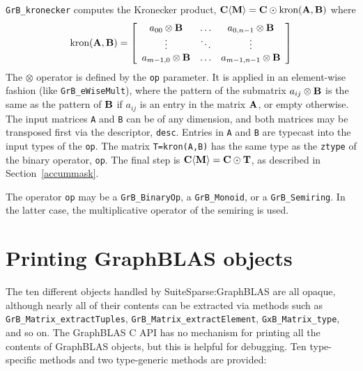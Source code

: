 \documentclass[12pt]{article}
\begin{document}
\verb'GrB_kronecker' computes the Kronecker product,
${\bf C \langle M \rangle = C \odot \mbox{kron}(A,B)}$ where
\[
\mbox{kron}{\bf (A,B)} =
\left[
    \begin{array}{ccc}
    a_{00} \otimes {\bf B} & \ldots & a_{0,n-1} \otimes {\bf B} \\
    \vdots & \ddots & \vdots \\
    a_{m-1,0} \otimes {\bf B} & \ldots & a_{m-1,n-1} \otimes {\bf B} \\
    \end{array}
\right]
\]
The $\otimes$ operator is defined by the \verb'op' parameter.  It is applied in
an element-wise fashion (like \verb'GrB_eWiseMult'), where the pattern of the
submatrix $a_{ij} \otimes {\bf B}$ is the same as the pattern of ${\bf B}$ if
$a_{ij}$ is an entry in the matrix ${\bf A}$, or empty otherwise.  The input
matrices \verb'A' and \verb'B' can be of any dimension, and both matrices may
be transposed first via the descriptor, \verb'desc'.  Entries in \verb'A' and
\verb'B' are typecast into the input types of the \verb'op'.  The matrix
\verb'T=kron(A,B)' has the same type as the \verb'ztype' of the binary
operator, \verb'op'.  The final step is ${\bf C \langle M \rangle  = C \odot
T}$, as described in Section~\ref{accummask}.

The operator \verb'op' may be a \verb'GrB_BinaryOp', a \verb'GrB_Monoid', or a
\verb'GrB_Semiring'.  In the latter case, the multiplicative operator of
the semiring is used.

\newpage
\section{Printing GraphBLAS objects} %
\label{fprint}

The ten different objects handled by SuiteSparse:GraphBLAS are all opaque,
although nearly all of their contents can be extracted via methods such as
\verb'GrB_Matrix_extractTuples', \verb'GrB_Matrix_extractElement',
\verb'GxB_Matrix_type', and so on.  The GraphBLAS C API has no mechanism for
printing all the contents of GraphBLAS objects, but this is helpful for
debugging.  Ten type-specific methods and two type-generic methods are
provided:
\end{document}
